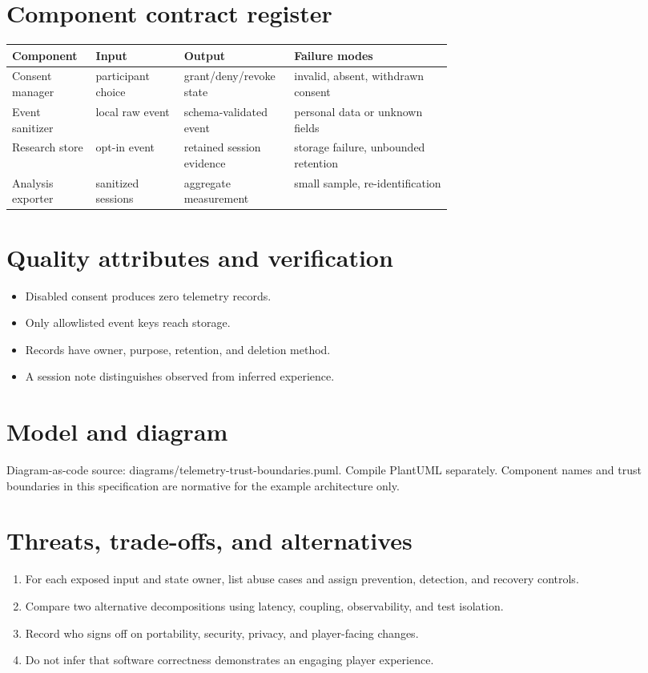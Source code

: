 \documentclass[11pt]{article}
\begin{document}
\section{Component contract register}
\begin{longtable}{@{}>{\raggedright\arraybackslash}p{0.19\linewidth}>{\raggedright\arraybackslash}p{0.20\linewidth}>{\raggedright\arraybackslash}p{0.25\linewidth}>{\raggedright\arraybackslash}p{}@{}}\toprule Component & Input & Output & Failure modes\\\midrule\endhead
Consent manager & participant choice & grant/deny/revoke state & invalid, absent, withdrawn consent \\
Event sanitizer & local raw event & schema-validated event & personal data or unknown fields \\
Research store & opt-in event & retained session evidence & storage failure, unbounded retention \\
Analysis exporter & sanitized sessions & aggregate measurement & small sample, re-identification \\
\bottomrule\end{longtable}

\section{Quality attributes and verification}
\begin{itemize}
\item Disabled consent produces zero telemetry records.
\item Only allowlisted event keys reach storage.
\item Records have owner, purpose, retention, and deletion method.
\item A session note distinguishes observed from inferred experience.
\end{itemize}

\section{Model and diagram}
Diagram-as-code source: diagrams/telemetry-trust-boundaries.puml. Compile PlantUML separately. Component names and trust boundaries in this specification are normative for the example architecture only.


\section{Threats, trade-offs, and alternatives}
\begin{enumerate}
\item For each exposed input and state owner, list abuse cases and assign prevention, detection, and recovery controls.
\item Compare two alternative decompositions using latency, coupling, observability, and test isolation.
\item Record who signs off on portability, security, privacy, and player-facing changes.
\item Do not infer that software correctness demonstrates an engaging player experience.
\end{enumerate}
\end{document}
